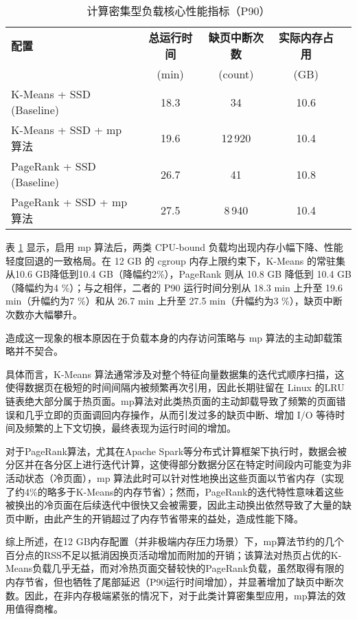 \begin{table}[htbp]
    \centering
    \caption{计算密集型负载核心性能指标（P90）}
    \label{tab:perf_metrics}
    \begin{tabular}{lcccc}
      \toprule
      \textbf{配置} & \textbf{总运行时间} & \textbf{缺页中断次数} & \textbf{实际内存占用} \\
                   & (min)                & (count)               & (GB)                 \\
      \midrule
      K-Means + SSD (Baseline) & 18.3 & 34 & 10.6 \\
      K-Means + SSD + mp 算法   & 19.6 & 12\,920 & 10.4 \\
      PageRank + SSD (Baseline) & 26.7 & 41 & 10.8 \\
      PageRank + SSD + mp 算法  & 27.5 & 8\,940 & 10.4 \\
      \bottomrule
    \end{tabular}
\end{table}

表 \ref{tab:perf_metrics} 显示，启用 mp 算法后，两类 CPU-bound 负载均出现内存小幅下降、性能轻度回退的一致格局。在 12 GB 的 cgroup 内存上限约束下，K-Means 的常驻集从10.6 GB降低到10.4 GB（降幅约2\%），PageRank 则从 10.8 GB 降低到 10.4 GB（降幅约为4 \%）；与之相伴，二者的 P90 运行时间分别从 18.3 min 上升至 19.6 min（升幅约为7 \%）和从 26.7 min 上升至 27.5 min（升幅约为3 \%），缺页中断次数亦大幅攀升。

造成这一现象的根本原因在于负载本身的内存访问策略与 mp 算法的主动卸载策略并不契合。

具体而言，K-Means 算法通常涉及对整个特征向量数据集的迭代式顺序扫描，这使得数据页在极短的时间间隔内被频繁再次引用，因此长期驻留在 Linux 的LRU链表绝大部分属于热页面。mp算法对此类热页面的主动卸载导致了频繁的页面错误和几乎立即的页面调回内存操作，从而引发过多的缺页中断、增加 I/O 等待时间及频繁的上下文切换，最终表现为运行时间的增加。

对于PageRank算法，尤其在Apache Spark等分布式计算框架下执行时，数据会被分区并在各分区上进行迭代计算，这使得部分数据分区在特定时间段内可能变为非活动状态（冷页面），mp 算法此时可以针对性地换出这些页面以节省内存（实现了约4\%的略多于K-Means的内存节省）；然而，PageRank的迭代特性意味着这些被换出的冷页面在后续迭代中很快又会被需要，因此主动换出依然导致了大量的缺页中断，由此产生的开销超过了内存节省带来的益处，造成性能下降。

综上所述，在12 GB内存配置（并非极端内存压力场景）下，mp算法节约的几个百分点的RSS不足以抵消因换页活动增加而附加的开销；该算法对热页占优的K-Means负载几乎无益，而对冷热页面交替较快的PageRank负载，虽然取得有限的内存节省，但也牺牲了尾部延迟（P90运行时间增加），并显著增加了缺页中断次数。因此，在非内存极端紧张的情况下，对于此类计算密集型应用，mp算法的效用值得商榷。


